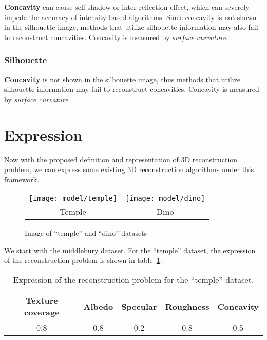 
\textbf{Concavity} can cause self-shadow or inter-reflection effect, which can severely impede the accuracy of intensity based algorithms. Since concavity is not shown in the silhouette image, methods that utilize silhouette information may also fail to reconstruct concavities. Concavity is measured by \textit{surface curvature}.

\subsubsection{Silhouette}
\textbf{Concavity} is not shown in the silhouette image, thus methods that utilize silhouette information may fail to reconstruct concavities. Concavity is measured by \textit{surface curvature}.

\section{Expression}
\label{sec:3DRecon_Exp}
Now with the proposed definition and representation of 3D reconstruction problem, we can express some existing 3D reconstruction algorithms under this framework.
\begin{figure}[h!]
\centering
\begin{tabular}{cc}
\texttt{[image: model/temple]}&
\texttt{[image: model/dino]}\\
Temple & Dino\\
\end{tabular}
\caption{Image of ``temple'' and ``dino'' datasets}
\label{fig:temple_dino}
\end{figure}

We start with the middlebury dataset. For the ``temple'' dataset, the expression of the reconstruction problem is shown in table~\ref{tab:exp_temple}.
\begin{table}[h]
  \centering
  \begin{tabular}{*{5}{c}}
  \hline
  Texture coverage & Albedo & Specular & Roughness & Concavity\\
  \hline
  0.8 & 0.8 & 0.2 & 0.8 & 0.5\\
  \hline
  \end{tabular}
  \label{tab:exp_temple}
  \caption{Expression of the reconstruction problem for the ``temple'' dataset.}
\end{table}

